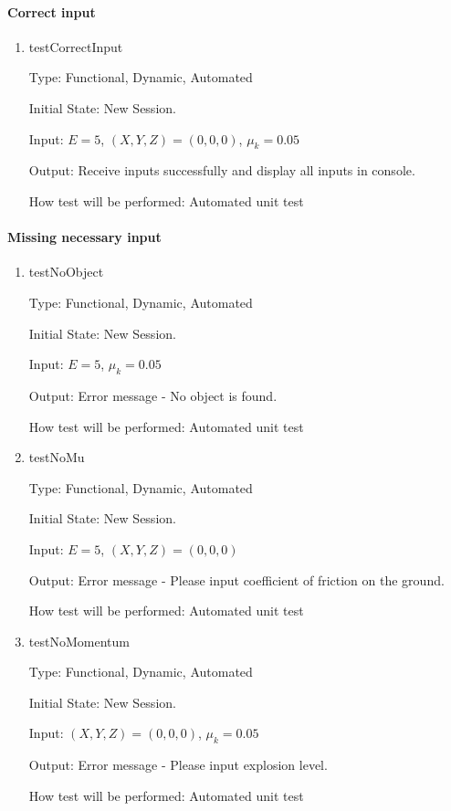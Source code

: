 \documentclass[12pt, titlepage]{article}
\begin{document}
\paragraph{Correct input}

\begin{enumerate}

\item{testCorrectInput\\}

Type: Functional, Dynamic, Automated

Initial State: New Session.

Input: $E = 5$, $(X,Y,Z) = (0,0,0)$, $\mu_{k} = 0.05$  

Output: Receive inputs successfully and display all inputs in console.

How test will be performed: Automated unit test 

\end{enumerate}

\paragraph{Missing necessary input}

\begin{enumerate}
	
\item{testNoObject\\}

Type: Functional, Dynamic, Automated
					
Initial State: New Session.
					
Input: $E = 5$, $\mu_{k} = 0.05$
					
Output: Error message - No object is found.
					
How test will be performed: Automated unit test
					
\item{testNoMu\\}

Type: Functional, Dynamic, Automated

Initial State: New Session.

Input: $E = 5$, $(X,Y,Z) = (0,0,0)$  

Output: Error message - Please input coefficient of friction on the ground.

How test will be performed: Automated unit test

\item{testNoMomentum\\}

Type: Functional, Dynamic, Automated

Initial State: New Session.

Input: $(X,Y,Z) = (0,0,0)$, $\mu_{k} = 0.05$  

Output: Error message - Please input explosion level.

How test will be performed: Automated unit test

\end{enumerate}
\end{document}
